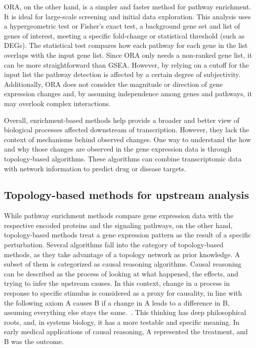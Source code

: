 \gls{ORA}, on the other hand, is a simpler and faster method for pathway enrichment. It is ideal for large-scale screening and initial data exploration. This analysis uses a hypergeometric test or Fisher's exact test, a background gene set and list of genes of interest, meeting a specific fold-change or statistical threshold (such as \gls{DEGs}).
The statistical test compares how each pathway for each gene in the list overlaps with the input gene list.
Since \gls{ORA} only needs a non-ranked gene list, it can be more straightforward than \gls{GSEA}.
However, by relying on a cutoff for the input list the pathway detection is affected by a certain degree of subjectivity. 
Additionally, \gls{ORA} does not consider the magnitude or direction of gene expression changes and, by assuming independence among genes and pathways, it may overlook complex interactions. 

Overall, enrichment-based methods help provide a broader and better view of biological processes affected downstream of transcription. However, they lack the context of mechanisms behind observed changes.
One way to understand the how and why those changes are observed in the gene expression data is through topology-based algorithms.
These algorithms can combine transcriptomic data with network information to predict drug or disease targets.


\subsection{Topology-based methods for upstream analysis} %
\label{sub:topologybasedmethodsforupstreamanalysis}

While pathway enrichment methods compare gene expression data with the respective encoded proteins and the signaling pathways, on the other hand, topology-based methods treat a gene expression pattern as the result of a specific perturbation. Several algorithms fall into the category of topology-based methods, as they take advantage of a topology network as prior knowledge. A subset of them is categorized as causal reasoning algorithms. Causal reasoning can be described as the process of looking at what happened, the effects, and trying to infer the upstream causes. In this context, change in a process in response to specific stimulus is considered as a proxy for causality, in line with the following axiom A causes B if a change in A leads to a difference in B, assuming everything else stays the same.~\cite{RN157}. This thinking has deep philosophical roots, and, in systems biology, it has a more testable and specific meaning. In early medical applications of causal reasoning, A represented the treatment, and B was the outcome. 

